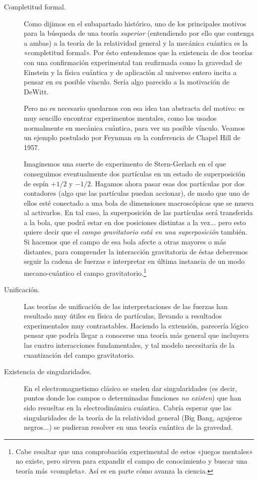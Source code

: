 \documentclass[11pt,a4paper,titlepage]{article}
\begin{document}
\begin{description}
\item[Completitud formal.]{Como dijimos en el subapartado histórico, uno de los principales motivos para la búsqueda de una teoría \textit{superior} (entendiendo por ello que contenga a ambas) a la teoría de la relatividad general y la mecánica cuántica es la «completitud formal». Por ésto entendemos que la existencia de dos teorías con una confirmación experimental tan reafirmada como la gravedad de Einstein y la física cuántica y de aplicación al universo entero incita a pensar en su posible vínculo. Sería algo parecido a la motivación de DeWitt.
\par Pero no es necesario quedarnos con esa idea tan abstracta del motivo: es muy sencillo encontrar experimentos mentales, como los usados normalmente en mecánica cuántica, para ver un posible vínculo. Veamos un ejemplo postulado por Feynman en la conferencia de Chapel Hill de 1957.
\par Imaginemos una suerte de experimento de Stern-Gerlach en el que conseguimos eventualmente dos partículas en un estado de superposición de espín $+1/2$ y $-1/2$. Hagamos ahora pasar esas dos partículas por dos contadores (algo que las partículas puedan accionar), de modo que uno de ellos esté conectado a una bola de dimensiones macroscópicas que se mueva al activarlos. En tal caso, la superposición de las partículas será transferida a la bola, que podrá estar en dos posiciones distintas a la vez... pero esto quiere decir que el \textit{campo gravitatorio está en una superposición} también. Si hacemos que el campo de esa bola afecte a otras mayores o más distantes, para comprender la interacción gravitatoria de éstas deberemos seguir la cadena de fuerzas e interpretar en última instancia de un modo mecano-cuántico el campo gravitatorio.\footnote{Cabe resaltar que una comprobación experimental de estos «juegos mentales» no existe, pero sirven para expandir el campo de conocimiento y buscar una teoría más «completa». Así es en parte cómo avanza la ciencia.}}
\item[Unificación.]{Las teorías de unificación de las interpretaciones de las fuerzas han resultado muy útiles en física de partículas, llevando a resultados experimentales muy contrastables. Haciendo la extensión, parecería lógico pensar que podría llegar a conocerse una teoría más general que incluyera las cuatro interacciones fundamentales, y tal modelo necesitaría de la cuantización del campo gravitatorio.}
\item[Existencia de singularidades.]{En el electromagnetismo clásico se suelen dar singularidades (es decir, puntos donde los campos o determinadas funciones \textit{no existen}) que han sido resueltas en la electrodinámica cuántica. Cabría esperar que las singularidades de la teoría de la relatividad general (Big Bang, agujeros negros...) se pudieran resolver en una teoría cuántica de la gravedad.}

\end{description}
\end{document}
